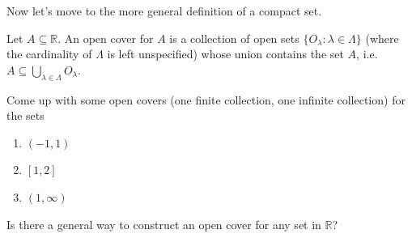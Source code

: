 \documentclass{ximera}
\begin{document}
Now let's move to the more general definition of a compact set.

    \begin{definition}
        Let $A\subseteq \mathbb{R}$.  An open cover for $A$ is a collection of open sets $\{O_\lambda: \lambda \in \Lambda\}$ (where the cardinality of $\Lambda$ is left unspecified) whose union contains the set $A$, i.e. $A \subseteq \bigcup\limits_{\lambda \in \Lambda} O_\lambda$.
    \end{definition}

\begin{exercise}
    Come up with some open covers (one finite collection, one infinite collection) for the sets 
    \begin{enumerate}
        \item $(-1,1)$
        \item $[1,2]$
        \item $(1, \infty)$
    \end{enumerate}
\end{exercise}
\begin{exercise}
    Is there a general way to construct an open cover for any set in $\mathbb{R}$?
\end{exercise}
\end{document}
